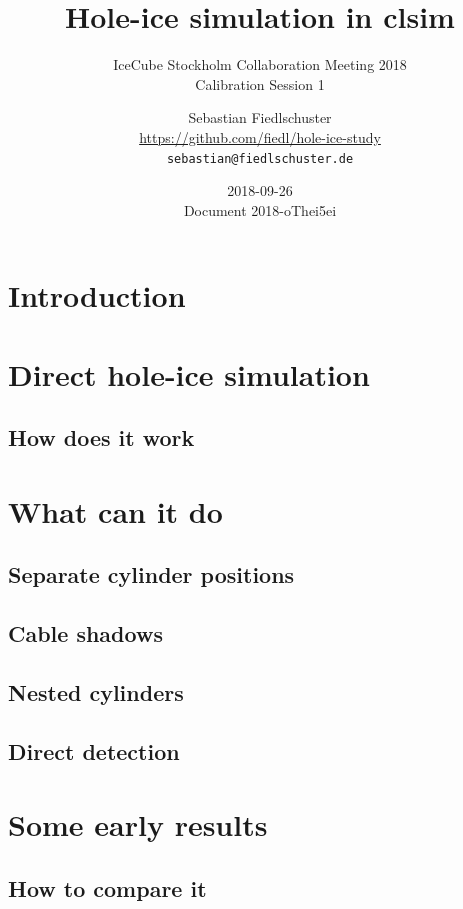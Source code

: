 \documentclass[green, 12pt]{beamer}
\title{Hole-ice simulation in clsim}
\subtitle{IceCube Stockholm Collaboration Meeting 2018 \\ Calibration Session 1}
\date[2018-09-26]{2018-09-26 \\ \vspace*{2mm} \tiny{Document 2018-oThei5ei}}
\author[Sebastian Fiedlschuster \texttt{<sebastian@fiedlschuster.de>}]{Sebastian Fiedlschuster \\ \tiny{\url{https://github.com/fiedl/hole-ice-study}} \\ \tiny\texttt{sebastian@fiedlschuster.de}}
\institute{Erlangen Centre for Astroparticle Physics}
\newif\ifplacelogo %
\begin{document}



\placelogofalse

\section{Introduction}
  
  


  \section{Direct hole-ice simulation}
  \subsection{How does it work}
    

  \section{What can it do}
  \subsection{Separate cylinder positions}
    
  \subsection{Cable shadows}
    
  \subsection{Nested cylinders}
    
    
  \subsection{Direct detection}
    

  \section{Some early results}
  \subsection{How to compare it}
    
\end{document}
